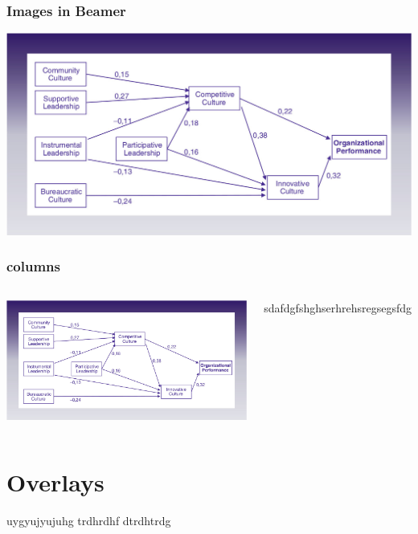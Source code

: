 \begin{frame}
\frametitle{Images in Beamer}

\includegraphics[scale=.25]{"./image/OB/Ogbonna & Harris.jpg"}

\end{frame}

\begin{frame}
\frametitle{columns}

\begin{columns}

\includegraphics[scale=.1]{"./image/OB/Ogbonna & Harris.jpg"}


sdafdgfshghserhrehsregsegsfdg

\end{columns}

\end{frame}
\section{Overlays}

\begin{frame}
uygyujyujuhg
trdhrdhf
dtrdhtrdg


\end{frame}



